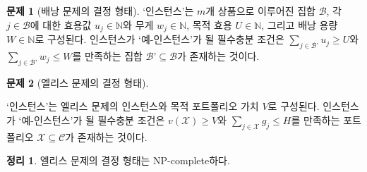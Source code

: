 \documentclass[11pt]{article} %
\newif\ifen
\newtheorem{theorem}{Theorem}
\theoremstyle{definition}
\newtheorem{problem}{Problem}
\newtheorem{theorem}{정리}
\theoremstyle{definition}
\newtheorem{problem}{문제}
\begin{document}
\begin{problem}[\ifen Decision form of knapsack problem\else 배낭 문제의 결정 형태\fi]
\ifen 
An \emph{instance} consists of a set $\mathcal{B}$ of $m$ objects, utility values $u_j \in \mathbb{N}$ and weight $w_j \in \mathbb{N}$ for each $j \in \mathcal{B}$, and target utility $U\in \mathbb{N}$ and knapsack capacity $W\in \mathbb{N}$. The instance is called a \emph{yes-instance} if and only if there exists a set $\mathcal{B’} \subseteq \mathcal{B}$ having $\sum_{j \in \mathcal{B’}} u_j \geq U$ and  $\sum_{j \in \mathcal{B’}} w_j \leq W$.
\else
`인스턴스'는 $m$개 상품으로 이루어진 집합 $\mathcal{B}$, 각 $j \in \mathcal{B}$에 대한 효용값 $u_j \in \mathbb{N}$와 무게 $w_j \in \mathbb{N}$, 목적 효용 $U\in \mathbb{N}$, 그리고 배낭 용량 $W\in \mathbb{N}$로 구성된다. 인스턴스가 `예-인스턴스'가 될 필수충분 조건은 $\sum_{j \in \mathcal{B’}} u_j \geq U$와  $\sum_{j \in \mathcal{B’}} w_j \leq W$를 만족하는 집합 $\mathcal{B’} \subseteq \mathcal{B}$가 존재하는 것이다.
\fi
\end{problem}

\begin{problem}[\ifen Decision form of Ellis's problem\else 엘리스 문제의 결정 형태\fi] \label{ellisdecisionform}
\ifen
An \emph{instance} consists of an instance of Ellis’s problem and a target valuation $V$. The instance is called a \emph{yes-instance} if and only if there exists a portfolio $\mathcal{X} \subseteq \mathcal{C}$ having $v(\mathcal{X}) \geq V$ and  $\sum_{j \in \mathcal{X}} g_j \leq H$.
\else
`인스턴스'는 엘리스 문제의 인스턴스와 목적 포트폴리오 가치 $V$로 구성된다. 인스턴스가 `예-인스턴스'가 될 필수충분 조건은 $v(\mathcal{X}) \geq V$와 $\sum_{j \in \mathcal{X}} g_j \leq H$를 만족하는 포트폴리오 $\mathcal{X} \subseteq \mathcal{C}$가 존재하는 것이다.
\fi
\end{problem}

\begin{theorem}
\ifen
The decision form of Ellis’s problem is NP-complete.
\else
엘리스 문제의 결정 형태는 NP-complete하다.
\fi
\end{theorem}
\end{document}
